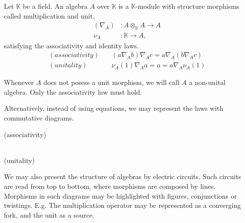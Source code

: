 \documentclass[../../thesis.tex]{subfiles}
\begin{document}
            \begin{definition}[Algebra]
                Let $\mathbb{K}$ be a field. An algebra $A$ over $\mathbb{K}$ is a $\mathbb{K}$-module with structure morphisms called multiplication and unit,
                \begin{align*}
                    (\nabla_A) & : A\otimes_{\mathbb{K}}A \rightarrow A \\
                    \nu_A & : \mathbb{K} \rightarrow A,
                \end{align*}
                satisfying the associativity and identity laws. 
                \begin{align*}
                    (associativity)\quad & (a \nabla_A b) \nabla_A c = a \nabla_A (b \nabla_A c) \\
                    (unitality)\quad & \nu_A(1) \nabla_A a = a = a \nabla_A \nu_A(1)
                \end{align*}
            \end{definition}
            \begin{remark}
                Whenever $A$ does not posess a unit morphism, we will call $A$ a non-unital algebra. Only the associativity law must hold.
            \end{remark}
            Alternatively, instead of using equations, we may represent the laws with commutative diagrams. 
            \begin{center}
                (associativity)\quad
                 \\
                (unitality) \quad
            \end{center}
            We may also present the structure of algebras by electric circuits. Such circuits are read from top to bottom, where morphisms are composed by lines. Morphisms in such diagrams may be highlighted with figures, conjunctions or twistings. E.g. The multiplication operator may be represented as a converging fork, and the unit as a source.
\end{document}
